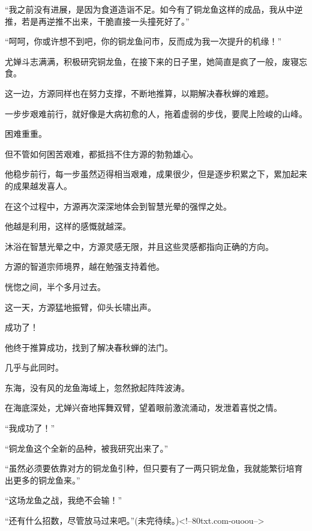 \begin{this_body}
“我之前没有进展，是因为食道造诣不足。如今有了铜龙鱼这样的成品，我从中逆推，若是再逆推不出来，干脆直接一头撞死好了。”

“呵呵，你或许想不到吧，你的铜龙鱼问市，反而成为我一次提升的机缘！”

尤婵斗志满满，积极研究铜龙鱼，在接下来的日子里，她简直是疯了一般，废寝忘食。

这一边，方源同样也在努力支撑，不断地推算，以期解决春秋蝉的难题。

一步步艰难前行，就好像是大病初愈的人，拖着虚弱的步伐，要爬上险峻的山峰。

困难重重。

但不管如何困苦艰难，都抵挡不住方源的勃勃雄心。

他稳步前行，每一步虽然迈得相当艰难，成果很少，但是逐步积累之下，累加起来的成果越发喜人。

在这个过程中，方源再次深深地体会到智慧光晕的强悍之处。

他越是利用，这样的感慨就越深。

沐浴在智慧光晕之中，方源灵感无限，并且这些灵感都指向正确的方向。

方源的智道宗师境界，越在勉强支持着他。

恍惚之间，半个多月过去。

这一天，方源猛地振臂，仰头长啸出声。

成功了！

他终于推算成功，找到了解决春秋蝉的法门。

几乎与此同时。

东海，没有风的龙鱼海域上，忽然掀起阵阵波涛。

在海底深处，尤婵兴奋地挥舞双臂，望着眼前激流涌动，发泄着喜悦之情。

“我成功了！”

“铜龙鱼这个全新的品种，被我研究出来了。”

“虽然必须要依靠对方的铜龙鱼引种，但只要有了一两只铜龙鱼，我就能繁衍培育出更多的铜龙鱼来。”

“这场龙鱼之战，我绝不会输！”

“还有什么招数，尽管放马过来吧。”(未完待续。)<!--80txt.com-ouoou-->

\end{this_body}

